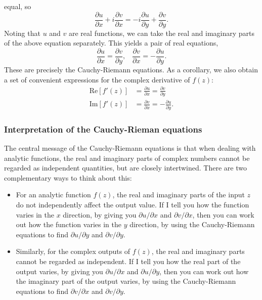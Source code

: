 \documentclass[10pt,a4paper]{article}
\begin{document}
equal, so
\begin{equation}
\frac{\partial u}{\partial x} + i \frac{\partial v}{\partial x} = -i\frac{\partial u}{\partial y} + \frac{\partial v}{\partial y}.
\end{equation}
Noting that $u$ and $v$ are real functions, we can take the real and
imaginary parts of the above equation separately. This yields a pair of
real equations,
\begin{equation}
\frac{\partial u}{\partial x} = \frac{\partial v}{\partial y}, \;\;\; \frac{\partial v}{\partial x} = -\frac{\partial u}{\partial y}.
\end{equation}
These are precisely the Cauchy-Riemann equations. As a corollary, we
also obtain a set of convenient expressions for the complex derivative
of $f(z)$:
\begin{align}
  \mathrm{Re}\left[f'(z)\right] &= \frac{\partial u}{\partial x} = \frac{\partial v}{\partial y} \\
  \mathrm{Im}\left[f'(z)\right] &= \frac{\partial v}{\partial x} = -\frac{\partial u}{\partial y}.
\end{align}

\subsubsection{Interpretation of the Cauchy-Rieman equations}
\label{interpretation-of-the-cauchy-riemann-equations}

The central message of the Cauchy-Riemann equations is that when
dealing with analytic functions, the real and imaginary parts of
complex numbers cannot be regarded as independent quantities, but are
closely intertwined. There are two complementary ways to think about
this:

\begin{itemize}
\item
  For an analytic function $f(z)$, the real and imaginary parts of the
  input $z$ do not independently affect the output value. If I tell
  you how the function varies in the $x$ direction, by giving you
  $\partial u/\partial x$ and $\partial v/\partial x$, then you can
  work out how the function varies in the $y$ direction, by using the
  Cauchy-Riemann equations to find $\partial u/\partial y$ and
  $\partial v/\partial y$.

\item
  Similarly, for the complex outputs of $f(z)$, the real and imaginary
  parts cannot be regarded as independent. If I tell you how the real
  part of the output varies, by giving you $\partial u/\partial x$ and
  $\partial u/\partial y$, then you can work out how the imaginary
  part of the output varies, by using the Cauchy-Riemann equations to
  find $\partial v/\partial x$ and $\partial v/\partial y$.
\end{itemize}
\end{document}

